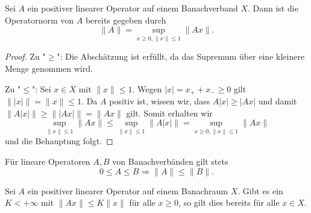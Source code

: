 \begin{prop}\label{Norm positiver Operatoren}
Sei $A$ ein positiver linearer Operator auf einem Banachverband $X$. Dann ist die Operatornorm von $A$ bereits gegeben durch
\begin{equation*}
\|A\|=\sup_{x\geq 0, \| x \| \leq 1} \|Ax\|.
\end{equation*}
\end{prop}

\begin{proof}
Zu "$\geq$": Die Abschätzung ist erfüllt, da das Supremum über eine kleinere Menge genommen wird.

\par 
Zu "$\leq$": Sei $x\in X$ mit $\|x\|\leq 1$. Wegen  $|x| = x_+ + x_-\geq0$ gilt $\||x|\|=\|x\|\leq 1$. Da $A$ positiv ist, wissen wir, dass $A|x|\geq |Ax|$ und damit $\|A|x|\|\geq \||Ax|\|=\|Ax\|$ gilt. Somit erhalten wir
\begin{equation*}
    \sup_{\|x\|\leq 1}\|Ax\|\leq\sup_{\|x\|\leq 1}\|A|x|\|=\sup_{x\geq 0,\|x\|\leq 1}\|Ax\|
\end{equation*}
und die Behauptung folgt.
\end{proof}

\begin{bem}
Für lineare Operatoren $A, B$ von Banachverbänden gilt stets
\begin{equation*}
0\leq A\leq B\Rightarrow \|A\|\leq \|B\|. 
\end{equation*}
\end{bem}


\begin{bem}
Sei $A$ ein positiver linearer Operator auf einem Banachraum $X$. Gibt es ein $K<+\infty$ mit $\|Ax\|\leq K\|x\|$ für alle $x\geq0$, so gilt dies bereits für alle $x\in X$.
\end{bem}










